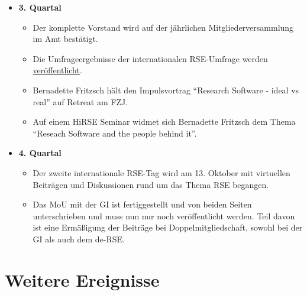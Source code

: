\begin{itemize}
\begin{itemize}
   \end{itemize}
 \item \textbf{3. Quartal}
   \begin{itemize}

    \item Der komplette Vorstand wird auf der jährlichen Mitgliederversammlung im Amt bestätigt.
    \item Die Umfrageergebnisse der internationalen RSE-Umfrage werden \href{https://softwaresaved.github.io/international-survey-2022/}{veröffentlicht}.
    \item Bernadette Fritzsch hält den Impulsvortrag "`Research Software - ideal vs real"' auf Retreat am FZJ.
    \item Auf einem HiRSE Seminar widmet sich Bernadette Fritzsch dem Thema "`Reseach Software and the people behind it"'.

   \end{itemize}
 \item \textbf{4. Quartal}
   \begin{itemize}
    \item Der zweite internationale RSE-Tag wird am 13. Oktober mit virtuellen Beiträgen und Diskussionen rund um das Thema RSE begangen.
    \item Das MoU mit der GI ist fertiggestellt und von beiden Seiten unterschrieben und muss nun nur noch veröffentlicht werden. Teil davon ist eine Ermäßigung der Beiträge bei Doppelmitgliedschaft, sowohl bei der GI als auch dem de-RSE.
   \end{itemize}
\end{itemize}

\section{Weitere Ereignisse}

